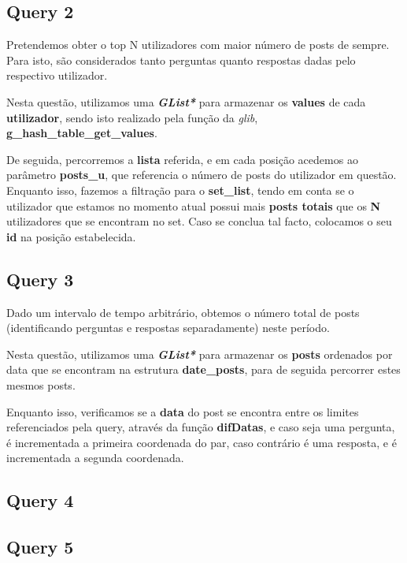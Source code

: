 \documentclass[a4paper]{article}
\begin{document}
\subsection{Query 2}

Pretendemos obter o top N utilizadores com maior número de posts de 
sempre. Para isto, são considerados tanto perguntas quanto respostas 
dadas pelo respectivo utilizador.

Nesta questão, utilizamos uma \textit{\textbf{GList*}} para armazenar 
os \textbf{values} de cada \textbf{utilizador}, sendo isto realizado
pela função da \textit{glib}, \textbf{g\_hash\_table\_get\_values}.

De seguida, percorremos a \textbf{lista} referida, e em cada posição
acedemos ao parâmetro \textbf{posts\_u}, que referencia o número de 
posts do utilizador em questão. Enquanto isso, fazemos a filtração
para o \textbf{set\_list}, tendo em conta se o utilizador que estamos
no momento atual possui mais \textbf{posts totais} que os \textbf{N} 
utilizadores que se encontram no set. Caso se conclua tal facto,
colocamos o seu \textbf{id} na posição estabelecida.

\subsection{Query 3}

Dado um intervalo de tempo arbitrário, obtemos o número total de posts 
(identificando perguntas e respostas separadamente) neste período.

Nesta questão, utilizamos uma \textit{\textbf{GList*}} para armazenar 
os \textbf{posts} ordenados por data que se encontram na estrutura 
\textbf{date\_posts}, para de seguida percorrer estes mesmos posts.

Enquanto isso, verificamos se a \textbf{data} do post se encontra entre 
os limites referenciados pela query, através da função \textbf{difDatas},
e caso seja uma pergunta, é incrementada a primeira coordenada do par,
caso contrário é uma resposta, e é incrementada a segunda coordenada.

\subsection{Query 4}

\subsection{Query 5}
\end{document}
